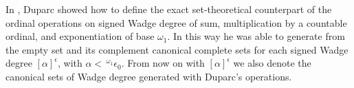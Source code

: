 In \cite{dup1}, Duparc showed how to define the exact set-theoretical counterpart of the ordinal operations on signed Wadge degree of sum, multiplication by a countable ordinal, and exponentiation of base $\omega_1$. In this way he was able to generate from the empty set and its complement canonical complete sets for each signed Wadge degree $[\alpha]^\epsilon$, with $\alpha <\,
{}^{\omega_1}\epsilon_0$. 
From now on with $[\alpha]^\epsilon$ we also denote the canonical sets of Wadge degree generated with Duparc's operations.





